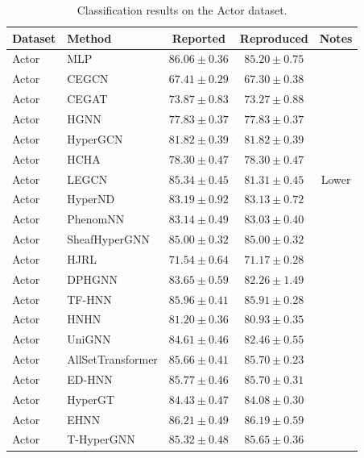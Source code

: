 \vspace{3em}

\begin{table}[H]
    \centering \small
    \renewcommand{\arraystretch}{1.12} 
    \begin{tabular}{llccc}
        \toprule
        Dataset & Method & Reported & Reproduced & Notes \\
        \midrule
        Actor & MLP & \(86.06 \pm 0.36\) & \(85.20 \pm 0.75\) & \\
        Actor & CEGCN & \(67.41 \pm 0.29\) & \(67.30 \pm 0.38\) & \\
        Actor & CEGAT & \(73.87 \pm 0.83\) & \(73.27 \pm 0.88\) & \\
        \grprule
        Actor & HGNN & \(77.83 \pm 0.37\) & \(77.83 \pm 0.37\) & \\
        Actor & HyperGCN & \(81.82 \pm 0.39\) & \(81.82 \pm 0.39\) & \\
        Actor & HCHA & \(78.30 \pm 0.47\) & \(78.30 \pm 0.47\) & \\
        Actor & LEGCN & \(85.34 \pm 0.45\) & \(81.31 \pm 0.45\) & Lower \\
        Actor & HyperND & \(83.19 \pm 0.92\) & \(83.13 \pm 0.72\) & \\
        Actor & PhenomNN & \(83.14 \pm 0.49\) & \(83.03 \pm 0.40\) & \\
        Actor & SheafHyperGNN & \(85.00 \pm 0.32\) & \(85.00 \pm 0.32\) & \\
        Actor & HJRL & \(71.54 \pm 0.64\) & \(71.17 \pm 0.28\) & \\
        Actor & DPHGNN & \(83.65 \pm 0.59\) & \(82.26 \pm 1.49\) & \\
        Actor & TF-HNN & \(85.96 \pm 0.41\) & \(85.91 \pm 0.28\) & \\
        \grprule
        Actor & HNHN & \(81.20 \pm 0.36\) & \(80.93 \pm 0.35\) & \\
        Actor & UniGNN & \(84.61 \pm 0.46\) & \(82.46 \pm 0.55\) & \\
        Actor & AllSetTransformer & \(85.66 \pm 0.41\) & \(85.70 \pm 0.23\) & \\
        Actor & ED-HNN & \(85.77 \pm 0.46\) & \(85.70 \pm 0.31\) & \\
        Actor & HyperGT & \(84.43 \pm 0.47\) & \(84.08 \pm 0.30\) & \\
        \grprule
        Actor & EHNN & \(86.21 \pm 0.49\) & \(86.19 \pm 0.59\) & \\
        Actor & T-HyperGNN & \(85.32 \pm 0.48\) & \(85.65 \pm 0.36\) & \\
        \bottomrule
    \end{tabular}
    \caption{Classification results on the Actor dataset.}
\end{table}

